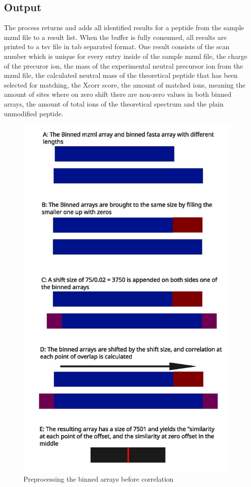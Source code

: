 \documentclass[11pt]{article}
\begin{document}
\subsection{Output}
The process returns and adds all identified results for a peptide from the sample mzml file to a result list. When the buffer is fully consumed, all results are printed to a tsv file in tab separated format. One result consists of the scan number which is unique for every entry inside of the sample mzml file, the charge of the precuror ion, the mass of the experimental neutral precursor ion from the mzml file, the calculated neutral mass of the theoretical peptide that has been selected for matching, the Xcorr score, the amount of matched ions, meaning the amount of sites where on zero shift there are non-zero values in both binned arrays, the amount of total ions of the theoretical spectrum and the plain unmodified peptide.
\begin{figure}
\includegraphics[width=\linewidth]{figs/crosscorr.jpg} 
\caption{Preprocessing the binned arrays before correlation}
\label{fig:corr}
\end{figure}
\end{document}
